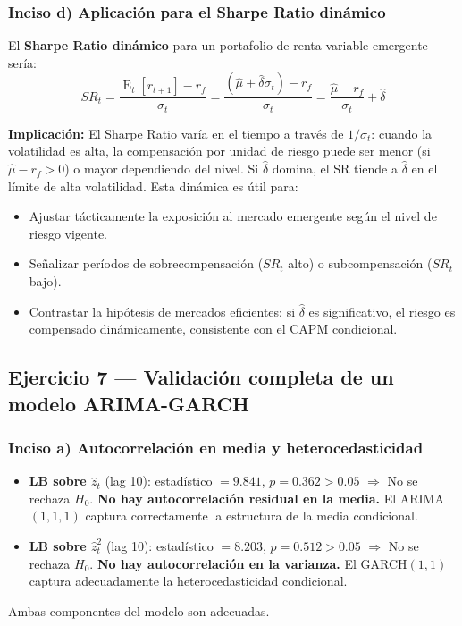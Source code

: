 \documentclass[12pt,a4paper]{article}
\DeclareMathOperator{\E}{E}
\begin{document}
\subsubsection*{Inciso d) Aplicación para el Sharpe Ratio dinámico}

\begin{solucion}
El \textbf{Sharpe Ratio dinámico} para un portafolio de renta variable emergente sería:
\begin{equation}
SR_t = \frac{\E_t[r_{t+1}]-r_f}{\sigma_t} = \frac{(\hat{\mu}+\hat{\delta}\sigma_t)-r_f}{\sigma_t} = \frac{\hat{\mu}-r_f}{\sigma_t}+\hat{\delta}
\end{equation}

\textbf{Implicación:} El Sharpe Ratio varía en el tiempo a través de $1/\sigma_t$: cuando la volatilidad es alta, la compensación por unidad de riesgo puede ser menor (si $\hat{\mu}-r_f>0$) o mayor dependiendo del nivel. Si $\hat{\delta}$ domina, el SR tiende a $\hat{\delta}$ en el límite de alta volatilidad. Esta dinámica es útil para:
\begin{itemize}[noitemsep]
  \item Ajustar tácticamente la exposición al mercado emergente según el nivel de riesgo vigente.
  \item Señalizar períodos de sobrecompensación ($SR_t$ alto) o subcompensación ($SR_t$ bajo).
  \item Contrastar la hipótesis de mercados eficientes: si $\hat{\delta}$ es significativo, el riesgo es compensado dinámicamente, consistente con el CAPM condicional.
\end{itemize}
\end{solucion}

\subsection{Ejercicio 7 — Validación completa de un modelo ARIMA-GARCH}

\subsubsection*{Inciso a) Autocorrelación en media y heterocedasticidad}

\begin{solucion}
\begin{itemize}[noitemsep]
  \item \textbf{LB sobre $\hat{z}_t$} (lag 10): estadístico $=9.841$, $p=0.362>0.05$ $\Rightarrow$ No se rechaza $H_0$. \textbf{No hay autocorrelación residual en la media.} El ARIMA$(1,1,1)$ captura correctamente la estructura de la media condicional.
  \item \textbf{LB sobre $\hat{z}_t^2$} (lag 10): estadístico $=8.203$, $p=0.512>0.05$ $\Rightarrow$ No se rechaza $H_0$. \textbf{No hay autocorrelación en la varianza.} El GARCH$(1,1)$ captura adecuadamente la heterocedasticidad condicional.
\end{itemize}
Ambas componentes del modelo son adecuadas.
\end{solucion}
\end{document}
